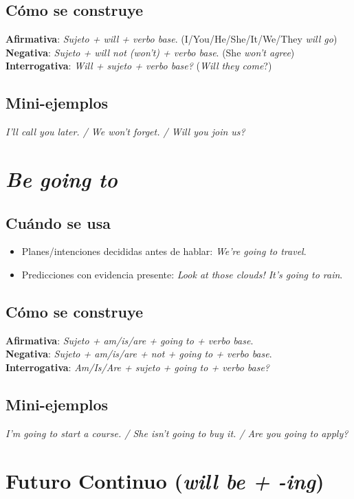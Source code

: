 \documentclass[11pt,a4paper]{article}
\begin{document}
\subsection*{Cómo se construye}
\textbf{Afirmativa}: \emph{Sujeto + will + verbo base}. (I/You/He/She/It/We/They \emph{will go})\\
\textbf{Negativa}: \emph{Sujeto + will not (won’t) + verbo base}. (She \emph{won’t agree})\\
\textbf{Interrogativa}: \emph{Will + sujeto + verbo base?} (\emph{Will they come}?)

\subsection*{Mini-ejemplos}
\emph{I’ll call you later. / We won’t forget. / Will you join us?}

\section{\emph{Be going to}}
\subsection*{Cuándo se usa}
\begin{itemize}
  \item Planes/intenciones decididas antes de hablar: \emph{We’re going to travel}.
  \item Predicciones con evidencia presente: \emph{Look at those clouds! It’s going to rain}.
\end{itemize}

\subsection*{Cómo se construye}
\textbf{Afirmativa}: \emph{Sujeto + am/is/are + going to + verbo base}.\\
\textbf{Negativa}: \emph{Sujeto + am/is/are + not + going to + verbo base}.\\
\textbf{Interrogativa}: \emph{Am/Is/Are + sujeto + going to + verbo base?}

\subsection*{Mini-ejemplos}
\emph{I’m going to start a course. / She isn’t going to buy it. / Are you going to apply?}

\section{Futuro Continuo (\emph{will be + -ing})}
\end{document}

